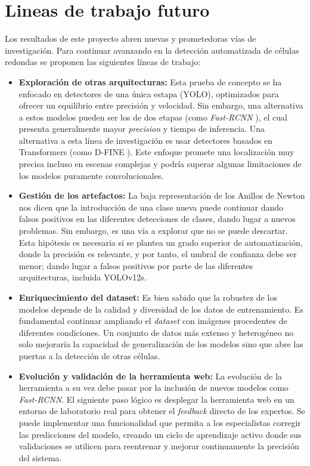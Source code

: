 \documentclass[12pt,a4paper,onecolumn,oneside]{report}
\begin{document}
\section{Lineas de trabajo futuro}
\label{sec:Lineas de trabajo futuro}

Los resultados de este proyecto abren nuevas y prometedoras vías de investigación. Para continuar avanzando en la detección automatizada de células redondas se proponen las siguientes líneas de trabajo:

\begin{itemize}
  \item \textbf{Exploración de otras arquitecturas:} Esta prueba de concepto se ha enfocado en detectores de una única estapa (YOLO), optimizados para ofrecer un equilibrio entre precisión y velocidad. Sin embargo, 
  una alternativa a estos modelos pueden ser los de dos etapas (como \textit{Fast-RCNN} \cite{7410526}), el cual presenta generalmente mayor \textit{precision} y tiempo de inferencia. Una alternativa a esta línea de investigación es usar detectores basados en Transformers
  (como D-FINE \cite{peng2024dfineredefineregressiontask}). Este enfoque promete una localización muy precisa incluso en escenas complejas y podría superar algunas limitaciones de los modelos puramente convolucionales.
  \item \textbf{Gestión de los artefactos:} La baja representación de los Anillos de Newton nos dicen que la introducción de una clase nueva puede continuar dando falsos positivos en las diferentes detecciones de clases, dando lugar
  a nuevos problemas. Sin embargo, es una vía a explorar que no se puede descartar. Esta hipótesis es necesaria si se plantea un grado superior de automatización, donde la precisión es relevante, y por tanto, el umbral de confianza debe ser menor; 
  dando lugar a falsos positivos por parte de las diferentes arquitecturas, incluida YOLOv12s.
  \item \textbf{Enriquecimiento del dataset:} Es bien sabido que la robustez de los modelos depende de la calidad y diversidad de los datos de entrenamiento. Es fundamental continuar ampliando el \textit{dataset} con imágenes procedentes de diferentes condiciones.
  Un conjunto de datos más extenso y heterogéneo no solo mejoraría la capacidad de generalización de los modelos sino que abre las puertas a la detección de otras células.
  \item \textbf{Evolución y validación de la herramienta web:} La evolución de la herramienta a su vez debe pasar por la inclusión de nuevos modelos como \textit{Fast-RCNN}. El siguiente paso lógico es desplegar la herramienta web en un entorno de laboratorio real 
  para obtener el \textit{feedback} directo de los expertos. Se puede implementar una funcionalidad que permita a los especialistas corregir las predicciones del modelo, creando un ciclo de aprendizaje activo donde sus validaciones se utilicen para reentrenar y mejorar continuamente la precisión del sistema.
\end{itemize}
\end{document}
